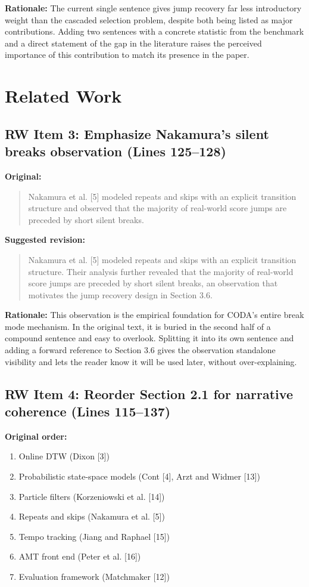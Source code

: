 \documentclass{article}
\begin{document}
\textbf{Rationale:}
The current single sentence gives jump recovery far less introductory weight than the cascaded selection problem, despite both being listed as major contributions. Adding two sentences with a concrete statistic from the benchmark and a direct statement of the gap in the literature raises the perceived importance of this contribution to match its presence in the paper.


\section*{Related Work}

\subsection*{RW Item 3: Emphasize Nakamura's silent breaks observation (Lines 125--128)}

\textbf{Original:}
\begin{quote}
Nakamura et al. [5] modeled repeats and skips with an explicit transition structure and observed that the majority of real-world score jumps are preceded by short silent breaks.
\end{quote}

\textbf{Suggested revision:}
\begin{quote}
Nakamura et al. [5] modeled repeats and skips with an explicit transition structure. Their analysis further revealed that the majority of real-world score jumps are preceded by short silent breaks, an observation that motivates the jump recovery design in Section 3.6.
\end{quote}

\textbf{Rationale:}
This observation is the empirical foundation for CODA's entire break mode mechanism. In the original text, it is buried in the second half of a compound sentence and easy to overlook. Splitting it into its own sentence and adding a forward reference to Section 3.6 gives the observation standalone visibility and lets the reader know it will be used later, without over-explaining.

\subsection*{RW Item 4: Reorder Section 2.1 for narrative coherence (Lines 115--137)}

\textbf{Original order:}
\begin{enumerate}
    \item Online DTW (Dixon [3])
    \item Probabilistic state-space models (Cont [4], Arzt and Widmer [13])
    \item Particle filters (Korzeniowski et al. [14])
    \item Repeats and skips (Nakamura et al. [5])
    \item Tempo tracking (Jiang and Raphael [15])
    \item AMT front end (Peter et al. [16])
    \item Evaluation framework (Matchmaker [12])
\end{enumerate}
\end{document}
